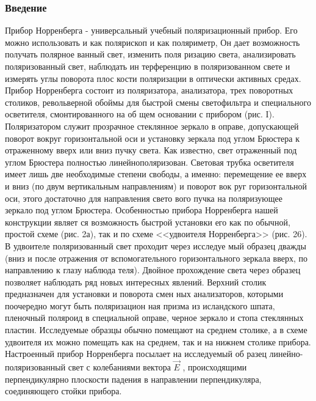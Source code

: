 \section{Введение}
Прибор Норренберга - универсальный учебный поляризационный
прибор. Его можно использовать и как полярископ и как поляриметр,
Он дает возможность получать полярное ванный свет, изменить поля­
ризацию света, анализировать поляризованный свет, наблюдать ин­
терференцию в поляризованном свете и измерять углы поворота плос­
кости поляризации в оптически активных средах.
Прибор Норренберга состоит из поляризатора, анализатора,
трех поворотных столиков, револьверной обоймы для быстрой смены
светофильтра и специального осветителя, смонтированного на об­
щем основании с прибором (рис. I).
Поляризатором служит прозрачное стеклянное зеркало в опра­ве, допускающей поворот вокруг горизонтальной оси и установку
зеркала под углом Брюстера к отраженному вверх или вниз пучку
света. Как известно, свет отраженный под углом Брюстера пол­ностью линейнополяризован. Световая трубка осветителя имеет
лишь две необходимые степени свободы, а именно: перемещение ее
вверх и вниз (по двум вертикальным направлениям) и поворот вок­
руг горизонтальной оси, этого достаточно для направления свето­
вого пучка на поляризующее зеркало под углом Брюстера.
Особенностью прибора Норренберга нашей конструкции являет­
ся возможность быстрой установки его как по обычной, простой
схеме (рис. 2а), так и по схеме <<удвоителя Норренберга>> (рис.
26). В удвоителе поляризованный свет проходит через исследуе­
мый образец дважды (вниз и после отражения от вспомогательного
горизонтального зеркала вверх, по направлению к глазу наблюда­
теля). Двойное прохождение света через образец позволяет наблюдать
ряд новых интересных явлений.
Верхний столик предназначен для установки и поворота смен­
ных анализаторов, которыми поочередно могут быть поляризацион­
ная призма из исландского шпата, пленочный поляроид в специальной оправе, черное зеркало и стопа стеклянных пластин.
Исследуемые образцы обычно помещают на среднем столике, а
в схеме удвоителя их можно помещать как на среднем, так и на
нижнем столике прибора.
Настроенный прибор Норренберга посылает на исследуемый об­
разец линейно-поляризованный свет с колебаниями вектора $\vec{E}$ ,
происходящими перпендикулярно плоскости падения в направлении
перпендикуляра, соединяющего стойки прибора.
\part{}
